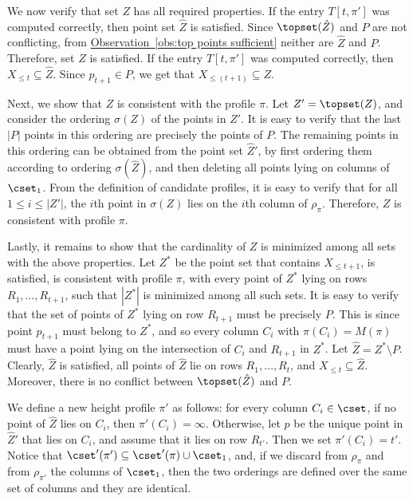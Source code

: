\documentclass[11pt]{article}
\numberwithin{equation}{section}
\theoremstyle{definition}
\theoremstyle{plain}
\newcommand{\expref}[2]{\hyperref[#2]{#1~\ref{#2}}}
\begin{document}
We now verify that set $Z$ has all required properties. If the entry $T[t,\pi']$ was computed correctly, then point set $\hat Z$ is satisfied. Since $\topset(\hat Z)$ and $P$ are not conflicting, from \expref{Observation}{obs:top points sufficient} neither are $\hat Z$ and $P$. Therefore, set $Z$ is satisfied. 
If the entry $T[t,\pi']$ was computed correctly, then $X_{\leq t}\subseteq \hat Z$. Since $p_{t+1}\in P$, we get that $X_{\leq (t+1)}\subseteq Z$. 

Next, we show that $Z$ is consistent with the profile $\pi$. Let $Z'=\topset(Z)$, and consider the ordering $\sigma(Z)$ of the points in $Z'$. It is easy to verify that the last $|P|$ points in this ordering are precisely the points of $P$. The remaining points in this ordering can be obtained from the point set $\hat Z'$, by first ordering them according to ordering $\sigma(\hat Z)$, and then deleting all points lying on columns of $\cset_1$. From the definition of candidate profiles, it is easy to verify that for all $1\leq i\leq |Z'|$, the $i$th point in $\sigma(Z)$ lies on the $i$th column of $\rho_{\pi}$. Therefore, $Z$ is consistent with profile $\pi$.


Lastly, it remains to show that the cardinality of $Z$ is minimized among all sets with the above properties. Let $Z^*$ be the point set that contains $X_{\leq t+1}$, is satisfied, is consistent with profile $\pi$, with every point of $Z^*$ lying on rows $R_1,\ldots,R_{t+1}$,  such that $|Z^*|$ is minimized among all such sets. It is easy to verify that the set of points of $Z^*$ lying on row $R_{t+1}$ must be precisely $P$. This is since point $p_{t+1}$ must belong to $Z^*$, and so every column $C_i$ with $\pi(C_i)=M(\pi)$ must have a point lying on the intersection of $C_i$ and $R_{t+1}$ in $Z^*$. Let $\hat Z=Z^*\setminus P$.
Clearly, $\hat Z$ is satisfied, all points of $\hat Z$ lie on rows $R_1,\ldots,R_t$, and $X_{\leq t}\subseteq \hat Z$. Moreover, there is no conflict between $\topset(\hat Z)$ and $P$.

We define a new height profile $\pi'$ as follows: for every column $C_i\in \cset$, if no point of $\hat Z$ lies on $C_i$, then $\pi'(C_i)=\infty$. Otherwise, let $p$ be the unique point in $\hat Z'$ that lies on $C_i$, and assume that it lies on row $R_{t'}$. Then we set $\pi'(C_i)=t'$. Notice that $\cset'(\pi')\subseteq \cset'(\pi)\cup \cset_1$, and, if we discard from $\rho_{\pi}$ and from $\rho_{\pi'}$ the columns of $\cset_1$, then the two orderings are defined over the same set of columns and they are identical.
\end{document}
